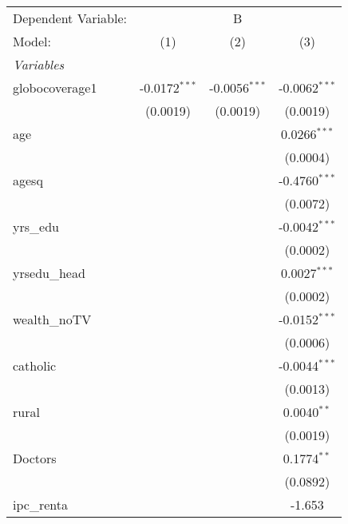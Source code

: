 
\begingroup
\centering
\begin{tabular}{lccc}
   \tabularnewline \midrule \midrule
   Dependent Variable: & \multicolumn{3}{c}{B}\\
   Model:         & (1)             & (2)                   & (3)\\  
   \midrule
   \emph{Variables}\\
   globocoverage1 & -0.0172$^{***}$ & -0.0056$^{***}$       & -0.0062$^{***}$\\   
                  & (0.0019)        & (0.0019)              & (0.0019)\\   
   age            &                 &                       & 0.0266$^{***}$\\   
                  &                 &                       & (0.0004)\\   
   agesq          &                 &                       & -0.4760$^{***}$\\   
                  &                 &                       & (0.0072)\\   
   yrs\_edu       &                 &                       & -0.0042$^{***}$\\   
                  &                 &                       & (0.0002)\\   
   yrsedu\_head   &                 &                       & 0.0027$^{***}$\\   
                  &                 &                       & (0.0002)\\   
   wealth\_noTV   &                 &                       & -0.0152$^{***}$\\   
                  &                 &                       & (0.0006)\\   
   catholic       &                 &                       & -0.0044$^{***}$\\   
                  &                 &                       & (0.0013)\\   
   rural          &                 &                       & 0.0040$^{**}$\\   
                  &                 &                       & (0.0019)\\   
   Doctors        &                 &                       & 0.1774$^{**}$\\   
                  &                 &                       & (0.0892)\\   
   ipc\_renta     &                 &                       & -1.653\\   

\end{tabular}
